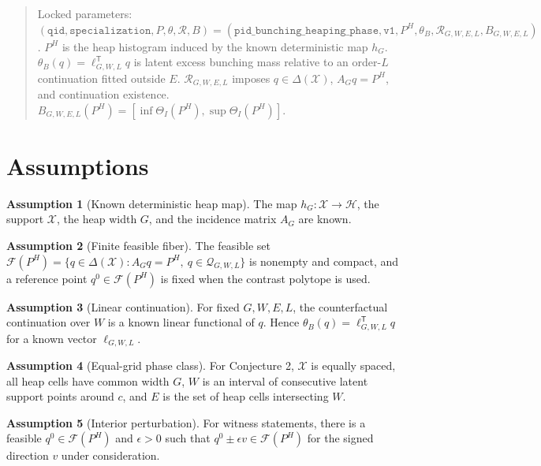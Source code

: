 \documentclass[11pt]{article}
\newcommand{\transpose}{\mathsf{T}}
\theoremstyle{definition}
\newtheorem{assumption}{Assumption}
\theoremstyle{plain}
\theoremstyle{remark}
\begin{document}
\begin{quote}\small
Locked parameters: \((\texttt{qid},\texttt{specialization},P,\theta,\mathcal{R},B)=(\texttt{pid\_bunching\_heaping\_phase},\texttt{v1},P^H,\theta_B,\mathcal{R}_{G,W,E,L},B_{G,W,E,L})\).  \(P^H\) is the heap histogram induced by the known deterministic map \(h_G\).  \(\theta_B(q)=\ell_{G,W,L}^{\transpose}q\) is latent excess bunching mass relative to an order-\(L\) continuation fitted outside \(E\).  \(\mathcal{R}_{G,W,E,L}\) imposes \(q\in\Delta(\mathcal{X})\), \(A_Gq=P^H\), and continuation existence.  \(B_{G,W,E,L}(P^H)=[\inf\Theta_I(P^H),\sup\Theta_I(P^H)]\).
\end{quote}

\section{Assumptions}
\begin{assumption}[Known deterministic heap map]\label{ass:heap}
The map \(h_G:\mathcal{X}\to\mathcal{H}\), the support \(\mathcal{X}\), the heap width \(G\), and the incidence matrix \(A_G\) are known.
\end{assumption}

\begin{assumption}[Finite feasible fiber]\label{ass:fiber}
The feasible set \(\mathcal{F}(P^H)=\{q\in\Delta(\mathcal{X}):A_Gq=P^H,\ q\in\mathcal{Q}_{G,W,L}\}\) is nonempty and compact, and a reference point \(q^0\in\mathcal{F}(P^H)\) is fixed when the contrast polytope is used.
\end{assumption}

\begin{assumption}[Linear continuation]\label{ass:linear-cont}
For fixed \(G,W,E,L\), the counterfactual continuation over \(W\) is a known linear functional of \(q\).  Hence \(\theta_B(q)=\ell_{G,W,L}^{\transpose}q\) for a known vector \(\ell_{G,W,L}\).
\end{assumption}

\begin{assumption}[Equal-grid phase class]\label{ass:equal-grid}
For Conjecture 2, \(\mathcal{X}\) is equally spaced, all heap cells have common width \(G\), \(W\) is an interval of consecutive latent support points around \(c\), and \(E\) is the set of heap cells intersecting \(W\).
\end{assumption}

\begin{assumption}[Interior perturbation]\label{ass:interior}
For witness statements, there is a feasible \(q^0\in\mathcal{F}(P^H)\) and \(\epsilon>0\) such that \(q^0\pm\epsilon v\in\mathcal{F}(P^H)\) for the signed direction \(v\) under consideration.
\end{assumption}
\end{document}
